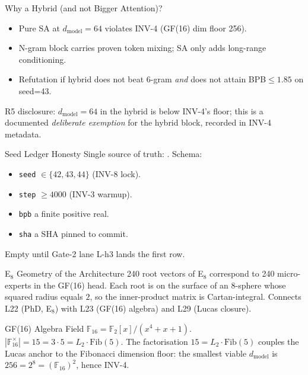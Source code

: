 \documentclass[10pt,aspectratio=169]{beamer}
\begin{document}
\begin{frame}{Why a Hybrid (and not Bigger Attention)?}
  \begin{itemize}
    \item Pure SA at $d_{\mathrm{model}}\!=\!64$ violates INV-4 (GF(16) dim floor 256).
    \item N-gram block carries proven token mixing; SA only adds long-range conditioning.
    \item Refutation if hybrid does not beat 6-gram \emph{and} does not attain BPB$\leq\!1{.}85$ on seed=43.
  \end{itemize}
  R5 disclosure: $d_{\mathrm{model}}\!=\!64$ in the hybrid is below INV-4's floor; this is a documented \emph{deliberate exemption} for the hybrid block, recorded in  INV-4 metadata.
\end{frame}

\begin{frame}{Seed Ledger Honesty}
  Single source of truth: .
  Schema:
  \begin{itemize}
    \item \texttt{seed} $\in\{42,43,44\}$ (INV-8 lock).
    \item \texttt{step} $\geq 4000$ (INV-3 warmup).
    \item \texttt{bpb} a finite positive real.
    \item \texttt{sha} a SHA pinned to  commit.
  \end{itemize}
  Empty until Gate-2 lane L-h3 lands the first row.
\end{frame}

\begin{frame}{E$_{8}$ Geometry of the Architecture}
  240 root vectors of E$_{8}$ correspond to 240 micro-experts in the GF(16) head.
  Each root is on the surface of an 8-sphere whose squared radius equals
  $2$, so the inner-product matrix is Cartan-integral.
  Connects L22 (PhD, E$_{8}$) with L23 (GF(16) algebra) and L29 (Lucas closure).
\end{frame}

\begin{frame}{GF(16) Algebra}
  Field $\mathbb{F}_{16}=\mathbb{F}_{2}[x]/(x^{4}+x+1)$.
  $|\mathbb{F}_{16}^{\times}|=15=3\cdot 5=L_{2}\cdot \mathrm{Fib}(5)$.
  The factorisation $15=L_{2}\cdot \mathrm{Fib}(5)$ couples the Lucas anchor
  to the Fibonacci dimension floor: the smallest viable
  $d_{\mathrm{model}}$ is $256=2^{8}=(\mathbb{F}_{16})^{2}$, hence INV-4.
\end{frame}
\end{document}
